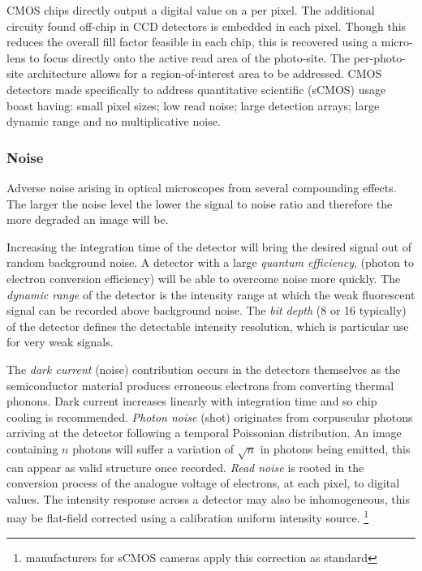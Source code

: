 CMOS chips directly output a digital value on a per pixel.
The additional circuity found off-chip in CCD detectors is embedded in each pixel.
Though this reduces the overall fill factor feasible in each chip, this is recovered using a micro-lens to focus directly onto the active read area of the photo-site.
The per-photo-site architecture allows for a region-of-interest area to be addressed.
CMOS detectors made specifically to address quantitative scientific (sCMOS) usage boast having: small pixel sizes; low read noise; large detection arrays; large dynamic range and no multiplicative noise.




\subsubsection{Noise}

Adverse noise arising in optical microscopes from several compounding effects.
The larger the noise level the lower the signal to noise ratio and therefore the more degraded an image will be.

Increasing the integration time of the detector will bring the desired signal out of random background noise.
A detector with a large \emph{quantum efficiency}, (photon to electron conversion efficiency) will be able to overcome noise more quickly.
The \emph{dynamic range} of the detector is the intensity range at which the weak fluorescent signal can be recorded above background noise.
The \emph{bit depth} (8 or \SI{16}{\bit} typically) of the detector defines the detectable intensity resolution, which is particular use for very weak signals.

The \emph{dark current} (noise) contribution occurs in the detectors themselves as the semiconductor material produces erroneous electrons from converting thermal phonons.
Dark current increases linearly with integration time and so chip cooling is recommended. \emph{Photon noise} (shot) originates from corpuscular photons arriving at the detector following a temporal Poissonian distribution.
An image containing $n$ photons will suffer a variation of $\sqrt{n}$ in photons being emitted, this can appear as valid structure once recorded. \emph{Read noise} is rooted in the conversion process of the analogue voltage of electrons, at each pixel, to digital values.
The intensity response across a detector may also be inhomogeneous, this may be flat-field corrected using a calibration uniform intensity source.
\footnote{manufacturers for sCMOS cameras apply this correction as standard}

